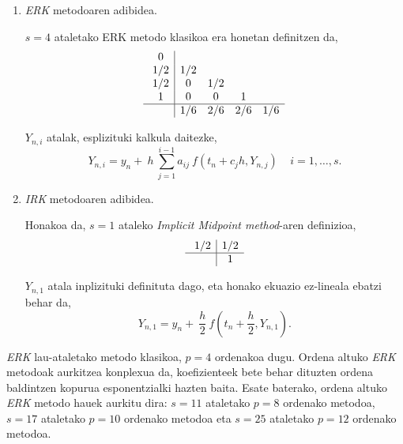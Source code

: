 \begin{enumerate}
\item \emph{ERK} metodoaren adibidea.

$s=4$ ataletako ERK metodo klasikoa era honetan definitzen da, 
\begin{equation*}
\begin{array}{c|cccc}
  \ 0   &    &    &     &      \\
  \ 1/2 & 1/2 &   &     &      \\
  \ 1/2 & 0   & 1/2  &  &      \\
  \ 1   & 0   & 0    &  1   &   \\
  \hline
  \     & 1/6 & 2/6  &  2/6 & 1/6 \\
  \end{array} \\
\end{equation*}

$Y_{n,i}$ atalak, esplizituki kalkula daitezke,
\begin{equation*}
Y_{n,i}=y_n+\ h\ \sum^{i-1}_{j=1}{a_{ij}\ f(t_n+c_jh,Y_{n,j})}\ \ \ \ \ i=1 ,\dots, s.
\end{equation*}  

\item \emph{IRK} metodoaren adibidea.

Honakoa da, $s=1$ ataleko \emph{Implicit Midpoint method}-aren definizioa, 
\begin{equation*}
\begin{array}{c|c}
  \ 1/2 &  1/2\\
  \hline
  \     & 1 \\
\end{array} \\
\end{equation*}

$Y_{n,1}$ atala inplizituki definituta dago, eta honako ekuazio ez-lineala ebatzi behar da,
\begin{equation*}
Y_{n,1}=y_n+\ \frac{h}{2} \ f(t_n+\frac{h}{2},Y_{n,1}).
\end{equation*} 

\end{enumerate}

\emph{ERK} lau-ataletako  metodo klasikoa, $p=4$ ordenakoa dugu. Ordena altuko \emph{ERK} metodoak aurkitzea konplexua da,  koefizienteek bete behar dituzten ordena baldintzen kopurua esponentzialki hazten baita. Esate baterako, ordena altuko \emph {ERK} metodo hauek aurkitu dira:  $s=11$ ataletako $p=8$ ordenako metodoa,  $s=17$ ataletako $p=10$ ordenako metodoa eta  $s=25$ ataletako $p=12$ ordenako metodoa.

